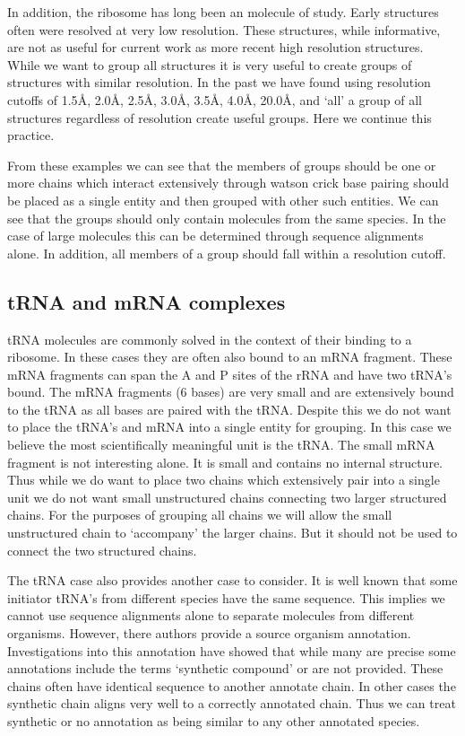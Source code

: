 In addition, the ribosome has long been an molecule of study. Early structures
\cite{Mueller2000} often were resolved at very low resolution. These structures,
while informative, are not as useful for current work as more recent high
resolution structures. While we want to group all structures it is very useful
to create groups of structures with similar resolution. In the past we have
found using resolution cutoffs of 1.5{\AA}, 2.0{\AA}, 2.5{\AA}, 3.0{\AA}, 3.5{\AA}, 4.0{\AA}, 20.0{\AA}, and
‘all’ a group of all structures regardless of resolution create useful groups.
Here we continue this practice.

From these examples we can see that the members of groups should be one or more
chains which interact extensively through watson crick base pairing should be
placed as a single entity and then grouped with other such entities. We can see
that the groups should only contain molecules from the same species. In the case
of large molecules this can be determined through sequence alignments alone.
In addition, all members of a group should fall within a resolution cutoff.

\subsection{tRNA and mRNA complexes}

tRNA molecules are commonly solved in the context of their binding to a
ribosome. In these cases they are often also bound to an mRNA fragment. These
mRNA fragments can span the A and P sites of the rRNA and have two tRNA’s bound.
The mRNA fragments (6 bases) are very small and are extensively bound to the
tRNA as all bases are paired with the tRNA. Despite this we do not want to place
the tRNA’s and mRNA into a single entity for grouping. In this case we believe
the most scientifically meaningful unit is the tRNA. The small mRNA fragment is
not interesting alone. It is small and contains no internal structure. Thus
while we do want to place two chains which extensively pair into a single unit
we do not want small unstructured chains connecting two larger structured
chains. For the purposes of grouping all chains we will allow the small
unstructured chain to ‘accompany’ the larger chains. But it should not be used
to connect the two structured chains.

The tRNA case also provides another case to consider. It is well known that some
initiator tRNA's from different species have the same sequence. This implies we
cannot use sequence alignments alone to separate molecules from different
organisms. However, there authors provide a source organism annotation.
Investigations into this annotation have showed that while many are precise some
annotations include the terms ‘synthetic compound’ or are not provided. These
chains often have identical sequence to another annotate chain. In other cases
the synthetic chain aligns very well to a correctly annotated chain. Thus we can
treat synthetic or no annotation as being similar to any other annotated
species.

